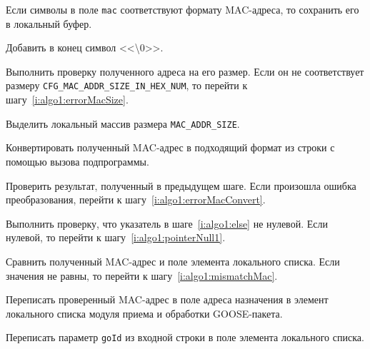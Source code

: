 \begin{enumerate_step}
    \item Если символы в поле \lstinline{mac} соответствуют формату MAC-адреса, то сохранить его в локальный буфер.
    \item Добавить в конец символ <<\textbackslash 0>>.
    \item Выполнить проверку полученного адреса на его размер. Если он не соответствует размеру \lstinline{CFG_MAC_ADDR_SIZE_IN_HEX_NUM}, то перейти к шагу~\ref{i:algo1:errorMacSize}.
    \item Выделить локальный массив размера \lstinline{MAC_ADDR_SIZE}.
    \item Конвертировать полученный MAC-адрес в подходящий формат из строки с помощью вызова подпрограммы.
    \item Проверить результат, полученный в предыдущем шаге. Если произошла ошибка преобразования, перейти к шагу~\ref{i:algo1:errorMacConvert}.
    \item Выполнить проверку, что указатель в шаге~\ref{i:algo1:else} не нулевой. Если нулевой, то перейти к шагу~\ref{i:algo1:pointerNull1}.
    \item Сравнить полученный MAC-адрес и поле элемента локального списка. Если значения не равны, то
    перейти к шагу~\ref{i:algo1:mismatchMac}.
    \item \label{i:algo1:pointerNull1} Переписать проверенный MAC-адрес в поле адреса назначения в элемент локального списка модуля приема и обработки GOOSE-пакета.

    \item Переписать параметр \lstinline{goId} из входной строки в поле элемента локального списка.


\end{enumerate_step}
